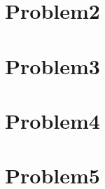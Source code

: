 \documentclass{article}
\begin{document}
\section{Problem2}

\section{Problem3}

\section{Problem4}

\section{Problem5}
\end{document}
